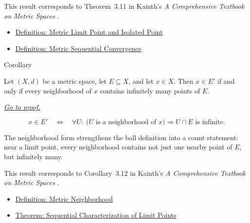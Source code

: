 \begin{remark*}
This result corresponds to Theorem~3.11 in Kainth's
\emph{A Comprehensive Textbook on Metric Spaces}
\cite{KainthComprehensiveMetricSpaces2023}.
\end{remark*}

\begin{dependencies}
\begin{itemize}
  \item \hyperref[def:metric-limit-point-isolated-point]{Definition: Metric Limit Point and Isolated Point}
  \item \hyperref[def:metric-sequential-convergence]{Definition: Metric Sequential Convergence}
\end{itemize}
\end{dependencies}

\begin{corollarybox}{Corollary}
\begin{corollary}
\label{cor:metric-limit-point-neighborhood-characterization}
Let \((X,d)\) be a metric space, let \(E\subseteq X\), and let \(x\in X\).
Then \(x\in E'\) if and only if every neighborhood of \(x\) contains
infinitely many points of \(E\).

\smallskip
\noindent
\hyperref[prf:metric-limit-point-neighborhood-characterization]{\textit{Go to proof.}}
\end{corollary}
\end{corollarybox}

\begin{remark*}
\[
x\in E'
\quad\Longleftrightarrow\quad
\forall U{:}\;
\bigl(U\text{ is a neighborhood of }x\bigr)
\Longrightarrow
U\cap E\text{ is infinite}.
\]
\end{remark*}

\begin{remark*}[Interpretation]
The neighborhood form strengthens the ball definition into a count statement:
near a limit point, every neighborhood contains not just one nearby point of
\(E\), but infinitely many.
\end{remark*}

\begin{remark*}
This result corresponds to Corollary~3.12 in Kainth's
\emph{A Comprehensive Textbook on Metric Spaces}
\cite{KainthComprehensiveMetricSpaces2023}.
\end{remark*}

\begin{dependencies}
\begin{itemize}
  \item \hyperref[def:metric-neighborhood]{Definition: Metric Neighborhood}
  \item \hyperref[thm:metric-limit-point-sequential-characterization]{Theorem: Sequential Characterization of Limit Points}
\end{itemize}
\end{dependencies}

